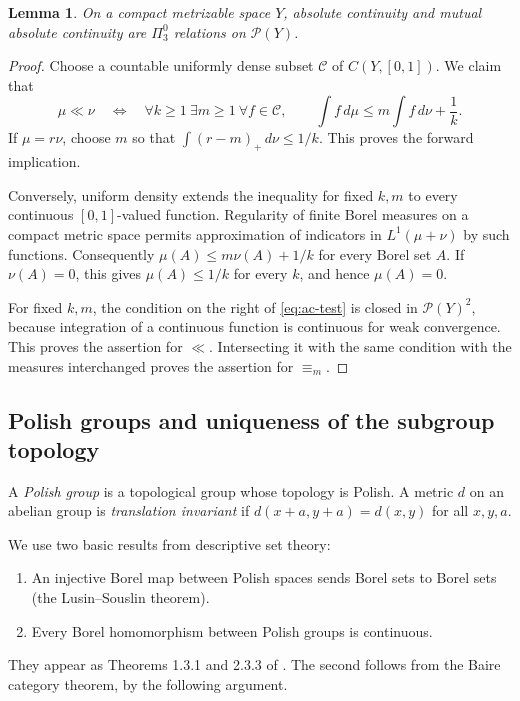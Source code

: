 \documentclass[11pt]{article}
\newtheorem{lemma}[theorem]{Lemma}
\theoremstyle{definition}
\newcommand{\Prob}{\mathcal P}
\newcommand{\ME}{\mathrel{\equiv_m}}
\begin{document}
\begin{lemma}\label{lem:ME-borel}
On a compact metrizable space $Y$, absolute continuity and mutual
absolute continuity are $\Pi^0_3$ relations on $\Prob(Y)$.
\end{lemma}
\begin{proof}
Choose a countable uniformly dense subset $\mathcal C$ of
$C(Y,[0,1])$. We claim that
\begin{equation}\label{eq:ac-test}
 \mu\ll\nu
 \quad\Longleftrightarrow\quad
 \forall k\ge1\ \exists m\ge1\ \forall f\in\mathcal C,\qquad
 \int f\,d\mu\le m\int f\,d\nu+\frac1k.
\end{equation}
If $\mu=r\nu$, choose $m$ so that
$\int(r-m)_+\,d\nu\le1/k$. This proves the forward implication.

Conversely, uniform density extends the inequality for fixed $k,m$ to
every continuous $[0,1]$-valued function. Regularity of finite Borel
measures on a compact metric space permits approximation of indicators
in $L^1(\mu+\nu)$ by such functions. Consequently
$\mu(A)\le m\nu(A)+1/k$ for every Borel set $A$. If $\nu(A)=0$, this
gives $\mu(A)\le1/k$ for every $k$, and hence $\mu(A)=0$.

For fixed $k,m$, the condition on the right of \eqref{eq:ac-test} is
closed in $\Prob(Y)^2$, because integration of a continuous function is
continuous for weak convergence. This proves the assertion for $\ll$.
Intersecting it with the same condition with the measures interchanged
proves the assertion for $\ME$.
\end{proof}

\subsection{Polish groups and uniqueness of the subgroup topology}
A \emph{Polish group} is a topological group whose topology is Polish.
A metric $d$ on an abelian group is \emph{translation invariant} if
$d(x+a,y+a)=d(x,y)$ for all $x,y,a$.

We use two basic results from descriptive set theory:
\begin{enumerate}
\item An injective Borel map between Polish spaces sends Borel sets to
Borel sets (the Lusin--Souslin theorem).
\item Every Borel homomorphism between Polish groups is continuous.
\end{enumerate}
They appear as Theorems 1.3.1 and 2.3.3 of \cite{Gao}. The second follows
from the Baire category theorem, by the following argument.
\end{document}
